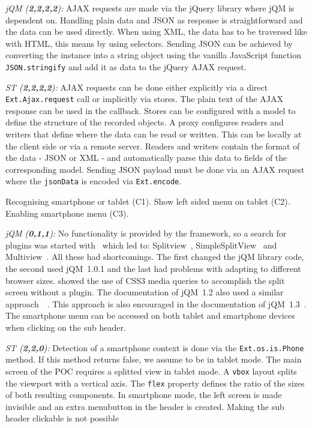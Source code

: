 \documentclass[a4paper]{artikel3}
\newcommand{\code}[1]{\texttt{#1}}
\newcommand{\setspace}[0]{\vspace{2mm}}
\renewcommand{\paragraph}[1]{\setspace \noindent {\bf #1}  }
\newcommand{\framework}[2]{ \emph{#1 (\textbf{#2}): }} %
\newcommand{\challenge}[1]{\paragraph{#1}}
\begin{document}
\framework{jQM}{2,2,2,2}
AJAX requests are made via the jQuery library where jQM is dependent on.
Handling plain data and JSON as response is straightforward and the data can be used directly.
When using XML, the data has to be traversed like with HTML, this means by using selectors.
Sending JSON can be achieved by converting the instance into a string object using the vanilla JavaScript function \code{JSON.stringify} and add it as data to the jQuery AJAX request.

\framework{ST}{2,2,2,2}
AJAX requests can be done either explicitly via a direct \code{Ext.Ajax.request} call or implicitly via stores.  
The plain text of the AJAX response can be used in the callback.   
Stores can be configured with a model to define the structure of the recorded objects.  
A proxy configures readers and writers that define where the data can be read or written.  
This can be locally at the client side or via a remote server.  
Readers and writers contain the format of the data - JSON or XML - and automatically parse this data to fields of the corresponding model. 
Sending JSON payload must be done via an AJAX request where the \code{jsonData} is encoded via \code{Ext.encode}.

\challenge{Device-specific layout (C1,C2,C3)}
Recognising smartphone or tablet (C1).
Show left sided menu on tablet (C2).
Enabling smartphone menu (C3).

\framework{jQM}{0,1,1}
No functionality is provided by the framework, so a search for plugins was started with~\cite{Deering2012} which led to: Splitview~\cite{Rahman2013}, SimpleSplitView~\cite{Yared2013} and Multiview~\cite{Franck2012}. 
All these had shortcomings. 
The first changed the jQM library code, the second used jQM~1.0.1 and the last had problems with adapting to different browser sizes.
\cite{Hadlock2012} showed the use of CSS3 media queries to accomplish the split screen without a plugin.
The documentation of jQM~1.2 also used a similar approach~~\cite{JQuery2012b}.
This approach is also encouraged in the documentation of jQM~1.3~\cite{JQuery2013e}.
The smartphone menu can be accessed on both tablet and smartphone devices when clicking on the sub header.

\framework{ST}{2,2,0}
Detection of a smartphone context is done via the \code{Ext.os.is.Phone} method.  
If this method returns false,  we assume to be in tablet mode.    
The main screen of the POC requires a splitted view in tablet mode.  
A \code{vbox} layout splits the viewport with a vertical axis.  
The \code{flex} property defines the ratio of the sizes of both resulting components.  
In smartphone mode,  the left screen is made invisible and an extra menubutton in the header is created.  
Making the sub header clickable is not possible  
\end{document}
